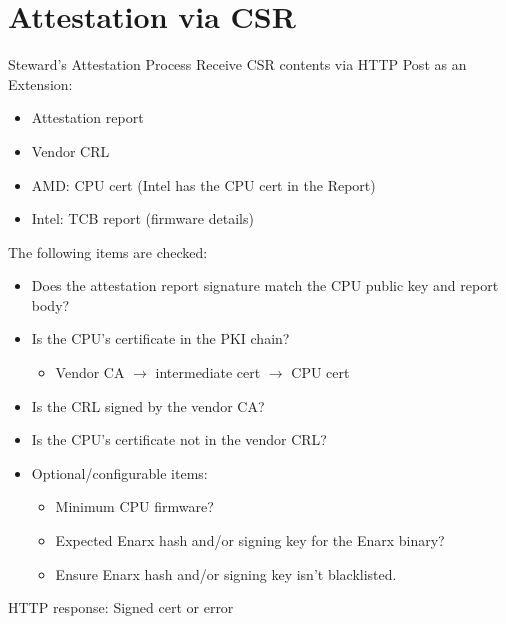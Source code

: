\documentclass[graphics,compress]{beamer}
\begin{document}
\section{Attestation via CSR}
\begin{frame}{Steward's Attestation Process}
Receive CSR contents via HTTP Post as an Extension:
\begin{itemize}
    \item Attestation report
    \item Vendor CRL
    \item AMD: CPU cert (Intel has the CPU cert in the Report)
    \item Intel: TCB report (firmware details)
\end{itemize}

The following items are checked:
\begin{itemize}
    \item Does the attestation report signature match the CPU public key and report body?
    \item Is the CPU's certificate in the PKI chain?
    \begin{itemize}
        \item Vendor CA $\rightarrow$ intermediate cert $\rightarrow$ CPU cert
    \end{itemize}
    \item Is the CRL signed by the vendor CA?
    \item Is the CPU's certificate not in the vendor CRL?
    \item Optional/configurable items:
    \begin{itemize}
        \item Minimum CPU firmware?
        \item Expected Enarx hash and/or signing key for the Enarx binary?
        \item Ensure Enarx hash and/or signing key isn't blacklisted.
    \end{itemize}
\end{itemize}

HTTP response: Signed cert or error
\end{frame}
\end{document}
